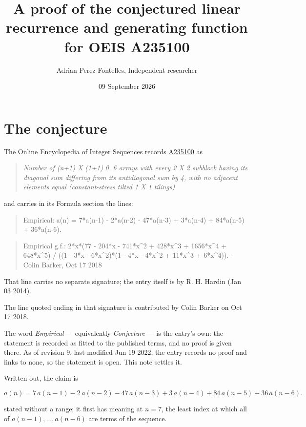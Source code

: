 \documentclass[11pt]{article}
\title{A proof of the conjectured linear recurrence and generating function for OEIS A235100}
\author{Adrian Perez Fontelles, Independent researcher}
\date{09 September 2026}
\theoremstyle{definition}
\begin{document}
\maketitle
\section{The conjecture}

The Online Encyclopedia of Integer Sequences records \href{https://oeis.org/A235100}{A235100} as

\begin{quote}\itshape Number of (n+1) X (1+1) 0..6 arrays with every 2 X 2 subblock having its diagonal sum differing from its antidiagonal sum by 4, with no adjacent elements equal (constant-stress tilted 1 X 1 tilings)\end{quote}

and carries in its Formula section the lines:

\begin{quote}\ttfamily Empirical: a(n) = 7*a(n-1) - 2*a(n-2) - 47*a(n-3) + 3*a(n-4) + 84*a(n-5) + 36*a(n-6).\end{quote}

\begin{quote}\ttfamily Empirical g.f.: 2*x*(77 - 204*x - 741*x\textasciicircum{}2 + 428*x\textasciicircum{}3 + 1656*x\textasciicircum{}4 + 648*x\textasciicircum{}5) / ((1 - 3*x - 6*x\textasciicircum{}2)*(1 - 4*x - 4*x\textasciicircum{}2 + 11*x\textasciicircum{}3 + 6*x\textasciicircum{}4)). - Colin Barker, Oct 17 2018\end{quote}

That line carries no separate signature; the entry itself is by R. H. Hardin (Jan 03 2014).

The line quoted ending in that signature is contributed by Colin Barker on Oct 17 2018.

The word {\itshape Empirical} --- equivalently {\itshape Conjecture} --- is the entry's own: the statement is recorded as fitted to the published terms, and no proof is given there. As of revision 9, last modified Jun 19 2022, the entry records no proof and links to none, so the statement is open. This note settles it.

Written out, the claim is

\[a(n) = 7\,a(n-1) - 2\,a(n-2) - 47\,a(n-3) + 3\,a(n-4) + 84\,a(n-5) + 36\,a(n-6).\]

stated without a range; it first has meaning at $n = 7$, the least index at which all of $a(n-1),\dots,a(n-6)$ are terms of the sequence.
\end{document}
